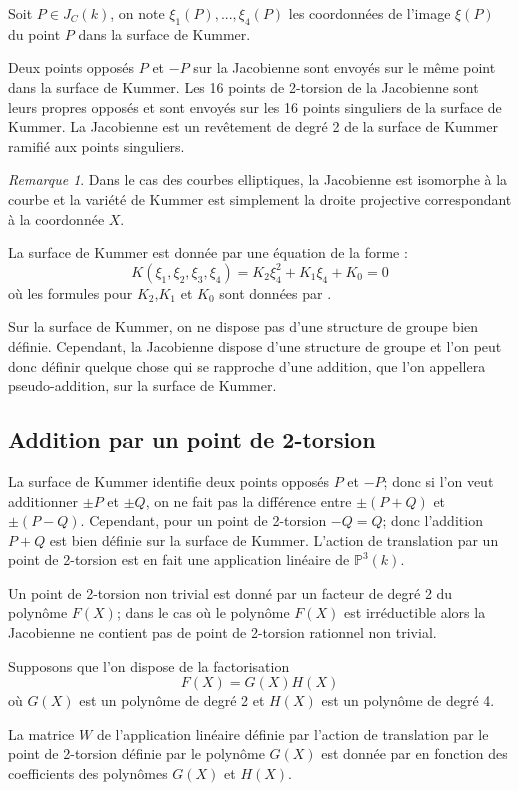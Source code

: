 \documentclass[a4paper]{article}
\theoremstyle{definition}
\theoremstyle{remark}
\newtheorem{remarque}{Remarque}
\numberwithin{equation}{section}
\begin{document}
Soit $P \in J_C(k)$, on note $\xi_1(P),...,\xi_4(P)$ les coordonnées de l'image $\xi(P)$ du point $P$ dans la surface de Kummer.

Deux points opposés $P$ et $-P$ sur la Jacobienne sont envoyés sur le même point dans la surface de Kummer. Les 16 points de 2-torsion de la Jacobienne sont leurs propres opposés et sont envoyés sur les 16 points singuliers de la surface de Kummer. La Jacobienne est un revêtement de degré 2 de la surface de Kummer ramifié aux points singuliers.

\begin{remarque}
Dans le cas des courbes elliptiques, la Jacobienne est isomorphe à la courbe et la variété de Kummer est simplement la droite projective correspondant à la coordonnée $X$.
\end{remarque}

La surface de Kummer est donnée par une équation de la forme :
$$K(\xi_1,\xi_2,\xi_3,\xi_4)=K_2\xi_4^2 + K_1\xi_4 + K_0 = 0$$
où les formules pour $K_2$,$K_1$ et $K_0$ sont données par \citet{eqKum}.

Sur la surface de Kummer, on ne dispose pas d'une structure de groupe bien définie. Cependant, la Jacobienne dispose d'une structure de groupe et l'on peut donc définir quelque chose qui se rapproche d'une addition, que l'on appellera pseudo-addition, sur la surface de Kummer.

\subsection{Addition par un point de 2-torsion}
La surface de Kummer identifie deux points opposés $P$ et $-P$; donc si l'on veut additionner $\pm P$ et $\pm Q$, on ne fait pas la différence entre $\pm (P+Q)$ et $\pm (P-Q)$. Cependant, pour un point de 2-torsion $-Q=Q$; donc l'addition $P+Q$ est bien définie sur la surface de Kummer. L'action de translation par un point de 2-torsion est en fait une application linéaire de $\mathbb{P}^3(k)$.

Un point de 2-torsion non trivial est donné par un facteur de degré 2 du polynôme $F(X)$; dans le cas où le polynôme $F(X)$ est irréductible alors la Jacobienne ne contient pas de point de 2-torsion rationnel non trivial.

Supposons que l'on dispose de la factorisation
$$F(X) = G(X)H(X)$$
où $G(X)$ est un polynôme de degré 2 et $H(X)$ est un polynôme de degré 4.

La matrice $W$ de l'application linéaire définie par l'action de translation par le point de 2-torsion définie par le polynôme $G(X)$ est donnée par \citet{eqKum} en fonction des coefficients des polynômes $G(X)$ et $H(X)$.
\end{document}
